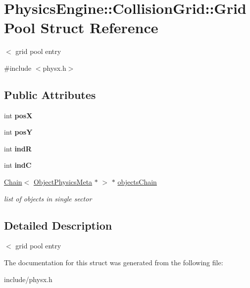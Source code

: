 \hypertarget{structPhysicsEngine_1_1CollisionGrid_1_1GridPool}{}\section{Physics\+Engine\+:\+:Collision\+Grid\+:\+:Grid\+Pool Struct Reference}
\label{structPhysicsEngine_1_1CollisionGrid_1_1GridPool}


$<$ grid pool entry  




{\ttfamily \#include $<$physx.\+h$>$}

\subsection*{Public Attributes}
\begin{DoxyCompactItemize}
\item 
\hypertarget{structPhysicsEngine_1_1CollisionGrid_1_1GridPool_acf5494022e0a7eca8d00d46c6e43c834}{}int {\bfseries pos\+X}\label{structPhysicsEngine_1_1CollisionGrid_1_1GridPool_acf5494022e0a7eca8d00d46c6e43c834}

\item 
\hypertarget{structPhysicsEngine_1_1CollisionGrid_1_1GridPool_a51161a1c55352d84bd7e0812ba996d5e}{}int {\bfseries pos\+Y}\label{structPhysicsEngine_1_1CollisionGrid_1_1GridPool_a51161a1c55352d84bd7e0812ba996d5e}

\item 
\hypertarget{structPhysicsEngine_1_1CollisionGrid_1_1GridPool_aa1ecde48801839a6f8c2b1b1ab45924a}{}int {\bfseries ind\+R}\label{structPhysicsEngine_1_1CollisionGrid_1_1GridPool_aa1ecde48801839a6f8c2b1b1ab45924a}

\item 
\hypertarget{structPhysicsEngine_1_1CollisionGrid_1_1GridPool_a9c88faa1afccad9de3594a8423247304}{}int {\bfseries ind\+C}\label{structPhysicsEngine_1_1CollisionGrid_1_1GridPool_a9c88faa1afccad9de3594a8423247304}

\item 
\hypertarget{structPhysicsEngine_1_1CollisionGrid_1_1GridPool_a43d308da68b4d33e19365f95717594b6}{}\hyperlink{classChain}{Chain}$<$ \hyperlink{classObjectPhysicsMeta}{Object\+Physics\+Meta} $\ast$ $>$ $\ast$ \hyperlink{structPhysicsEngine_1_1CollisionGrid_1_1GridPool_a43d308da68b4d33e19365f95717594b6}{objects\+Chain}\label{structPhysicsEngine_1_1CollisionGrid_1_1GridPool_a43d308da68b4d33e19365f95717594b6}

\begin{DoxyCompactList}\small\item\em list of objects in single sector \end{DoxyCompactList}\end{DoxyCompactItemize}


\subsection{Detailed Description}
$<$ grid pool entry 

The documentation for this struct was generated from the following file\+:\begin{DoxyCompactItemize}
\item 
include/physx.\+h\end{DoxyCompactItemize}
